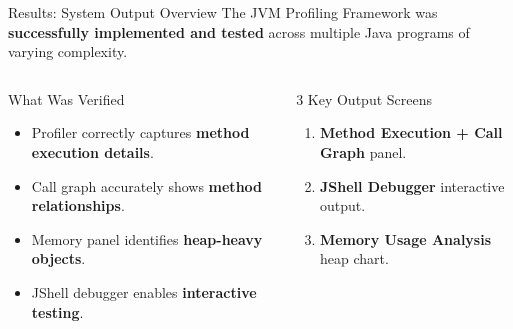 \documentclass[aspectratio=169]{beamer}
\begin{document}
\begin{frame}{Results: System Output Overview}
  The JVM Profiling Framework was \textbf{successfully implemented and tested}
  across multiple Java programs of varying complexity.
  \vspace{8pt}
  \begin{columns}[T]
      \begin{exampleblock}{What Was Verified}
        \begin{itemize}\small\itemsep3pt
          \item Profiler correctly captures \textbf{method execution details}.
          \item Call graph accurately shows \textbf{method relationships}.
          \item Memory panel identifies \textbf{heap-heavy objects}.
          \item JShell debugger enables \textbf{interactive testing}.
        \end{itemize}
      \end{exampleblock}
      \begin{block}{3 Key Output Screens}
        \begin{enumerate}\small\itemsep3pt
          \item \textbf{Method Execution + Call Graph} panel.
          \item \textbf{JShell Debugger} interactive output.
          \item \textbf{Memory Usage Analysis} heap chart.
        \end{enumerate}
      \end{block}
  \end{columns}
  \vspace{8pt}
  \begin{center}
  \end{center}
\end{frame}
\end{document}
